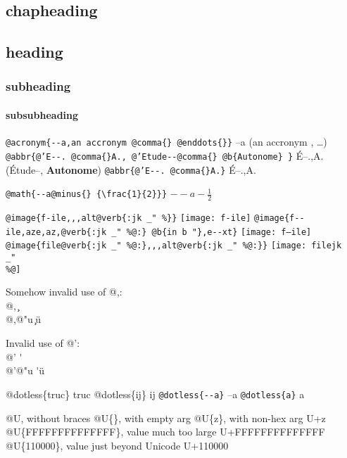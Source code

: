 \documentclass{book}
\newcommand{\GNUTexinfoplaceholder}[1]{}
\newcommand{\GNUTexinfonopagebreakheading}[2]{\let\clearpage\relax \let\cleardoublepage\relax \let\thispagestyle\GNUTexinfoplaceholder #1{#2}}
\renewcommand{\includegraphics}[1]{\fbox{FIG #1}}
\begin{document}
\begin{titlepage}
\GNUTexinfonopagebreakheading{\chapter*}{chapheading}

\GNUTexinfonopagebreakheading{\section*}{heading}

\GNUTexinfonopagebreakheading{\subsection*}{subheading}

\GNUTexinfonopagebreakheading{\subsubsection*}{subsubheading}


\texttt{@acronym\{{-}{-}a,an accronym @comma\{\} @enddots\{\}\}} --a (an accronym , \dots{})
\texttt{@abbr\{@'E{-}{-}. @comma\{\}A., @'Etude{-}{-}@comma\{\} @b\{Autonome\} \}} \'{E}--.\@ ,A.\@ (\'{E}tude--, \textbf{Autonome})
\texttt{@abbr\{@'E{-}{-}. @comma\{\}A.\}} \'{E}--.\@ ,A.\@

\texttt{@math\{{-}{-}a@minus\{\} \{\textbackslash{}frac\{1\}\{2\}\}\}} $--a- {\frac{1}{2}}$

\texttt{@image\{f-ile,,,alt@verb\{:jk \_" \%\@\}\}} \texttt{[image: f-ile]}
\texttt{@image\{f{-}{-}ile,aze,az,@verb\{:jk \_" \%@:\} @b\{in b "\},e{-}{-}xt\}} \texttt{[image: f--ile]}
\texttt{@image\{file@verb\{:jk \_" \%@:\},,,alt@verb\{:jk \_" \%@:\}\}} \texttt{[image: filejk \\\_" \\\%@]}




Somehow invalid use of @,:\leavevmode{}\\
@, \c{}
\leavevmode{}\\
@,@"u \c{}\"{u}

Invalid use of @':\leavevmode{}\\
@' \'{}
\leavevmode{}\\
@'@"u \'{}\"{u}

@dotless\{truc\} truc
@dotless\{ij\} ij
\texttt{@dotless\{{-}{-}a\}} --a
\texttt{@dotless\{a\}} a

@U, without braces @U\{\}, with empty arg 
@U\{z\}, with non-hex arg U+z
@U\{FFFFFFFFFFFFFF\}, value much too large U+FFFFFFFFFFFFFF
@U\{110000\}, value just beyond Unicode U+110000


\end{titlepage}
\end{document}
